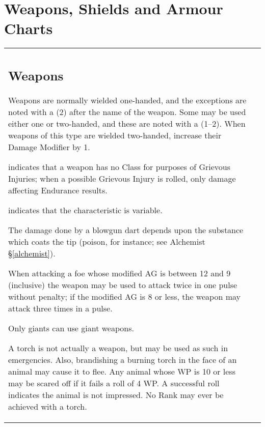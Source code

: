 \section{Weapons, Shields and Armour Charts}

\begin{tabular}[t]{l|r}
\begin{minipage}[t]{2.1in}
\subsection{Weapons}
\label{tables:weapons}

Weapons are normally wielded one-handed, and the exceptions are noted
with a (2) after the name of the weapon.  Some may be used either one
or two-handed, and these are noted with a (1--2).  When weapons of
this type are wielded two-handed, increase their Damage Modifier by 1.

{\setlength\leftmargini{0pt}
\begin{description}
\setlength\itemsep{0pt}
\item[-] indicates that a weapon has no Class for purposes of Grievous
Injuries; when a possible Grievous Injury is rolled, only damage
affecting Endurance results.

\item[V] indicates that the characteristic is variable.

\item[*] The damage done by a blowgun dart depends upon the substance
which coats the tip (poison, for instance; see Alchemist
\S\ref{alchemist}).
\end{description}}

{\setlength\leftmargini{0pt}
\begin{description}
\setlength\itemsep{0pt}
\item[A] When attacking a foe whose modified AG is between 12 and 9
(inclusive) the weapon may be used to attack twice in one pulse
without penalty; if the modified AG is 8 or less, the weapon may
attack three times in a pulse.

\item[B] Only giants can use giant weapons.

\item[C] A torch is not actually a weapon, but may be used as such in
emergencies.  Also, brandishing a burning torch in the face of an
animal may cause it to flee.  Any animal whose WP is 10 or less may be
scared off if it fails a roll of 4 \x WP.  A successful roll indicates
the animal is not impressed.  No Rank may ever be achieved with a
torch.


\end{description}}
\end{minipage}
\end{tabular}
